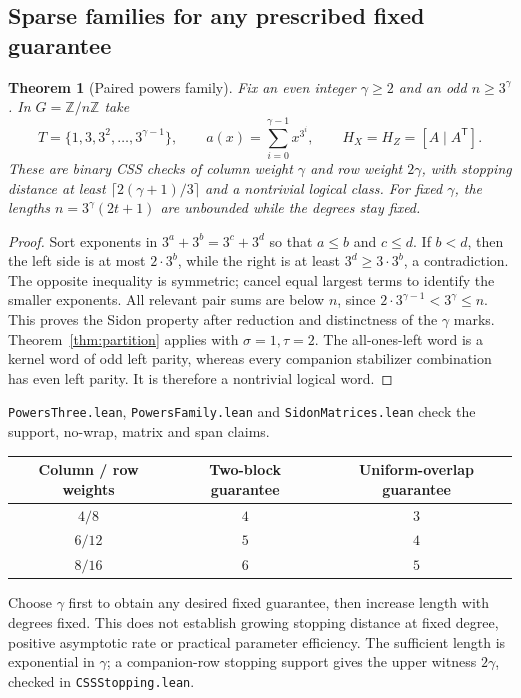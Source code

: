 \documentclass[11pt]{article}
\newtheorem{theorem}{Theorem}
\begin{document}
\subsection{Sparse families for any prescribed fixed guarantee}
\begin{theorem}[Paired powers family]\label{thm:paired}
Fix an even integer $\gamma\ge2$ and an odd $n\ge3^\gamma$. In
$G=\mathbb Z/n\mathbb Z$ take
\[
 T=\{1,3,3^2,\ldots,3^{\gamma-1}\},\qquad
 a(x)=\sum_{i=0}^{\gamma-1}x^{3^i},\qquad H_X=H_Z=[A\mid A^{\mathsf T}].
\]
These are binary CSS checks of column weight $\gamma$ and row weight $2\gamma$,
with stopping distance at least $\lceil2(\gamma+1)/3\rceil$ and a nontrivial
logical class. For fixed $\gamma$, the lengths $n=3^\gamma(2t+1)$ are unbounded
while the degrees stay fixed.
\end{theorem}
\begin{proof}
Sort exponents in $3^a+3^b=3^c+3^d$ so that $a\le b$ and $c\le d$.
If $b<d$, then the left side is at most $2\cdot3^b$, while the right is at
least $3^d\ge3\cdot3^b$, a contradiction. The opposite inequality is symmetric;
cancel equal largest terms to identify the smaller exponents. All relevant pair
sums are below $n$, since $2\cdot3^{\gamma-1}<3^\gamma\le n$. This proves the
Sidon property after reduction and distinctness of the $\gamma$ marks.
Theorem~\ref{thm:partition} applies with $\sigma=1,\tau=2$.
The all-ones-left word is a kernel word of odd left parity, whereas every
companion stabilizer combination has even left parity. It is therefore a
nontrivial logical word.
\end{proof}
\texttt{PowersThree.lean}, \texttt{PowersFamily.lean} and
\texttt{SidonMatrices.lean} check the support, no-wrap, matrix and span claims.
\begin{center}
\begin{tabular}{@{}ccc@{}}\toprule
Column / row weights & Two-block guarantee & Uniform-overlap guarantee\\\midrule
$4/8$ & $4$ & $3$\\
$6/12$ & $5$ & $4$\\
$8/16$ & $6$ & $5$\\\bottomrule
\end{tabular}
\end{center}
Choose $\gamma$ first to obtain any desired fixed guarantee, then increase
length with degrees fixed. This does not establish growing stopping distance at
fixed degree, positive asymptotic rate or practical parameter efficiency.
The sufficient length is exponential in $\gamma$; a companion-row stopping
support gives the upper witness $2\gamma$, checked in \texttt{CSSStopping.lean}.
\end{document}
